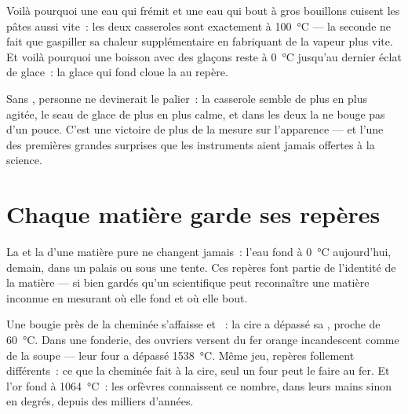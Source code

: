 \begin{example}\label{ex:g4:changes-of-state:kitchen}
Voilà pourquoi une eau qui frémit et une eau qui bout à gros
bouillons cuisent les pâtes aussi vite~: les deux casseroles sont
exactement à \qty{100}{\celsius} --- la seconde ne fait que gaspiller
sa chaleur supplémentaire en fabriquant de la vapeur plus vite. Et
voilà pourquoi une boisson avec des glaçons reste à \qty{0}{\celsius}
jusqu'au dernier éclat de glace~: la glace qui fond cloue la
 au repère.
\end{example}

\begin{remark}\label{rem:g4:changes-of-state:invisible}
Sans , personne ne devinerait le palier~: la casserole
semble de plus en plus agitée, le seau de glace de plus en plus
calme, et dans les deux la  ne bouge pas d'un pouce. C'est
une victoire de plus de la mesure sur l'apparence --- et l'une des
premières grandes surprises que les instruments aient jamais offertes
à la science.
\end{remark}

\section{Chaque matière garde ses repères}

\begin{proposition}\label{prop:g4:changes-of-state:identity}
La  et la  d'une matière
pure ne changent jamais~: l'eau fond à \qty{0}{\celsius} aujourd'hui,
demain, dans un palais ou sous une tente. Ces repères font partie de
l'identité de la matière --- si bien gardés qu'un scientifique peut
reconnaître une matière inconnue en mesurant où elle fond et où elle
bout.
\end{proposition}

\begin{example}\label{ex:g4:changes-of-state:foundry}
Une bougie près de la cheminée s'affaisse et ~: la cire a
dépassé sa , proche de \qty{60}{\celsius}. Dans
une fonderie, des ouvriers versent du fer  orange
incandescent comme de la soupe --- leur four a dépassé
\qty{1538}{\celsius}. Même jeu, repères follement différents~: ce que
la cheminée fait à la cire, seul un four peut le faire au fer. Et
l'or fond à \qty{1064}{\celsius}~: les orfèvres connaissent ce
nombre, dans leurs mains sinon en degrés, depuis des milliers
d'années.
\end{example}

